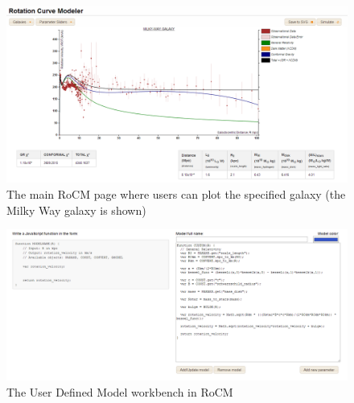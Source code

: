 \documentclass[conference]{IEEEtran}
\begin{document}
\begin{figure}[h!]
\centering
\includegraphics[width=\textwidth, frame,trim = -1cm -1cm -1cm -1cm, clip]{rocm_screenshot}
\caption{The main RoCM page where users can plot the specified galaxy (the Milky Way galaxy is shown)}
\label{rocm_fig}
\end{figure}


\begin{figure}[h!]
\centering
\includegraphics[width=\textwidth, frame]{udm}
\caption{The User Defined Model workbench in RoCM}
\label{udm}
\end{figure}
\end{document}
